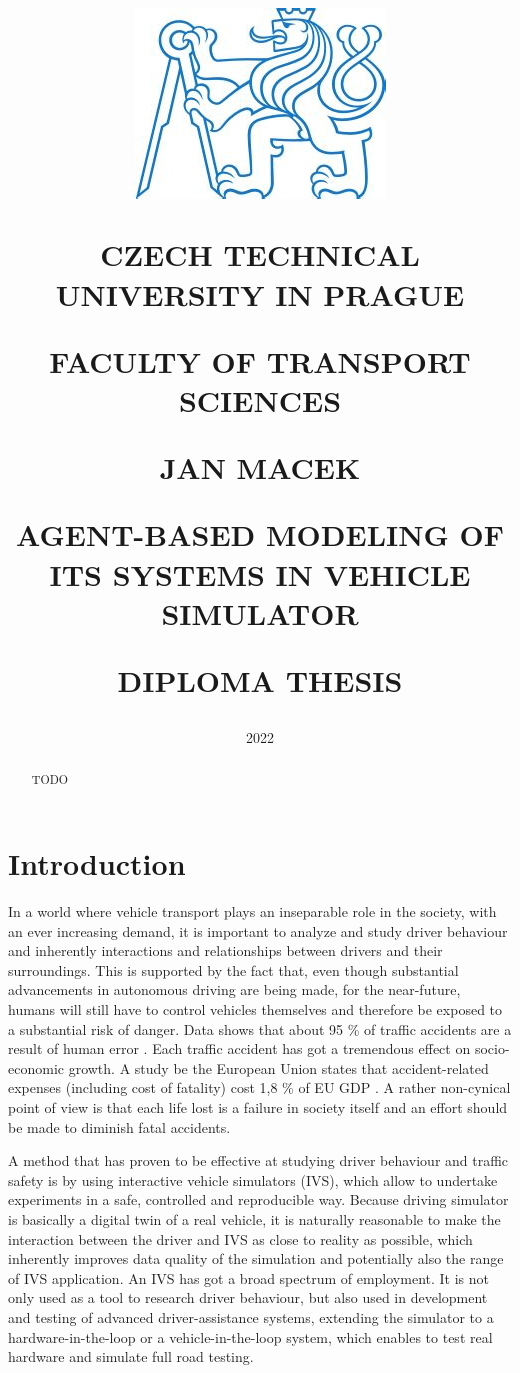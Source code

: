 \documentclass[titlepage, 12pt, draft]{article}
\title{
\includegraphics[width=.3\textwidth]{cvut-logo.jpg}\par
\vspace{10mm}
\indent
\textbf{CZECH TECHNICAL UNIVERSITY IN PRAGUE}

FACULTY OF TRANSPORT SCIENCES

\vfill

{\Large JAN MACEK}
\vspace{10mm}

AGENT-BASED MODELING OF ITS SYSTEMS IN VEHICLE SIMULATOR 
\vspace{15mm}

{\Large DIPLOMA THESIS}
\vfill

}
\date{\Large 2022}
\begin{document}
\setlength{\baselineskip}{1.5em}
\maketitle



\begin{abstract}
    TODO
\end{abstract}

\tableofcontents
\newpage

\section{Introduction}

In a world where vehicle transport plays an inseparable role in the society, with an ever increasing
demand, it is important to analyze and study driver behaviour and inherently interactions and
relationships between drivers and their surroundings. This is supported by the fact that, even though
substantial advancements in autonomous driving are being made, for the near-future, humans will still
have to control vehicles themselves and therefore be exposed to a substantial risk of danger. 
Data shows that about 95 \% of traffic accidents are a result of human error \cite{Parliament2021}. 
Each traffic accident has got a tremendous effect on socio-economic growth. A study be the European
Union states that accident-related expenses (including cost of fatality) cost 1,8 \% of EU GDP \cite{Wijnen2017}.  
A rather non-cynical point of view is that each life lost is a failure in society itself and an effort
should be made to diminish fatal accidents.

A method that has proven to be effective at studying driver behaviour and
traffic safety is by using interactive vehicle simulators (IVS), which allow to
undertake experiments in a safe, controlled and reproducible way.  Because
driving simulator is basically a digital twin of a real vehicle, it is naturally
reasonable to make the interaction between the driver and IVS as close to
reality as possible, which inherently improves data quality of the simulation
and potentially also the range of IVS application. An IVS has got a broad
spectrum of employment. It is not only used as a tool to research driver
behaviour, but also used in development and testing of advanced
driver-assistance systems, extending the simulator to a hardware-in-the-loop or
a vehicle-in-the-loop system, which enables to test real hardware and simulate
full road testing.
\end{document}
